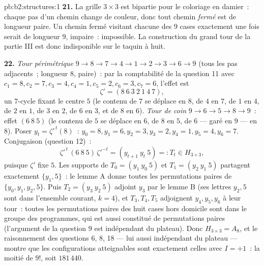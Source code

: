 \begin{solution}{pb:b2:structures:1}
\textbf{21.} La grille $3 \times 3$ est bipartie pour le coloriage en
damier~: chaque pas d'un chemin change de couleur, donc tout chemin
\emph{fermé} est de longueur paire. Un chemin fermé visitant chacune
des $9$ cases exactement une fois serait de longueur $9$, impaire~:
impossible. La construction du grand tour de la partie III est donc
indisponible sur le taquin à huit.

\textbf{22.} \emph{Tour périmétrique} $9 \to 8 \to 7 \to 4 \to 1
\to 2 \to 3 \to 6 \to 9$ (tous les pas adjacents~; longueur $8$,
paire)~: par la comptabilité de la question 11 avec $c_1 = 8, c_2 =
7, c_3 = 4, c_4 = 1, c_5 = 2, c_6 = 3, c_7 = 6$, l'effet est
\[
\zeta' = (8\ 6\ 3\ 2\ 1\ 4\ 7),
\]
un $7$-cycle fixant le centre $5$ (le contenu de $7$ se déplace en
$8$, de $4$ en $7$, de $1$ en $4$, de $2$ en $1$, de $3$ en $2$, de
$6$ en $3$, et de $8$ en $6$). \emph{Tour de coin} $9 \to 6 \to
5 \to 8 \to 9$~: effet $(6\ 8\ 5)$ (le contenu de $5$ se déplace en
$6$, de $8$ en $5$, de $6$ --- garé en $9$ --- en $8$). Poser
$y_t = \zeta'^{\,t}(8)$~: $y_0 = 8, y_1 = 6, y_2 = 3, y_3 = 2,
y_4 = 1, y_5 = 4, y_6 = 7$. Conjugaison (question 12)~:
\[
\zeta'^{\,t}\,(6\ 8\ 5)\,\zeta'^{-t}
= (y_{t+1}\ y_t\ 5) =: T_t \in H_{3\times3},
\]
puisque $\zeta'$ fixe $5$. Les supports de $T_0 = (y_1\ y_0\ 5)$
et $T_1 = (y_2\ y_1\ 5)$ partagent exactement $\{y_1, 5\}$~: le
lemme A donne toutes les permutations paires de $\{y_0, y_1, y_2,
5\}$. Puis $T_2 = (y_3\ y_2\ 5)$ adjoint $y_3$ par le lemme B (ses
lettres $y_2, 5$ sont dans l'ensemble courant, $k = 4$), et $T_3,
T_4, T_5$ adjoignent $y_4, y_5, y_6$ à leur tour~: toutes les
permutations paires des huit cases hors domicile sont dans le groupe
des programmes, qui est aussi constitué de permutations paires
(l'argument de la question 9 est indépendant du plateau). Donc
$H_{3\times3} = A_8$, et le raisonnement des questions 6, 8, 18 ---
lui aussi indépendant du plateau --- montre que les configurations
atteignables sont exactement celles avec $I = +1$~: la moitié de
$9!$, soit $181\,440$.


\end{solution}
